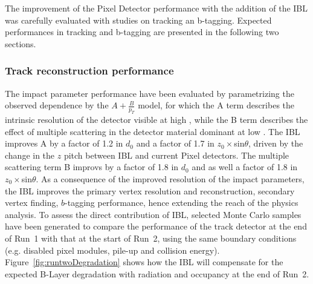 The improvement of the Pixel Detector performance with the addition of the IBL was carefully evaluated with studies on tracking an b-tagging. Expected performances in tracking and b-tagging are presented in the following two sections.

\subsubsection{Track reconstruction performance}
The impact parameter performance have been evaluated by parametrizing the observed \pt dependence by the $A+\frac{B}{p_T }$ model, for which the A term describes the intrinsic resolution of the detector visible at high \pt , while the B term describes the effect of multiple scattering in the detector material dominant at low \pt.
The IBL improves A by a factor of 1.2 in $d_0$ and a factor of 1.7 in $z_0 \times$sin$\theta$, driven by the change in the $z$ pitch between IBL and current Pixel detectors. The multiple scattering term B improvs by a factor of 1.8 in $d_0$ and as well a factor of 1.8 in $z_0 \times$sin$\theta$. As a consequence of the improved resolution of the impact parameters, the IBL improves the primary vertex resolution and reconstruction, secondary vertex finding, $b$-tagging performance, hence extending the reach of the physics analysis. To assess the direct contribution of IBL, selected Monte Carlo samples have been generated to compare the performance of the track detector at the end of Run~1 with that at the start of Run~2, using the same boundary conditions (e.g. disabled pixel modules, pile-up and collision energy).
Figure~\ref{fig:runtwoDegradation} shows how the IBL will compensate for the expected B-Layer degradation with radiation and occupancy at the end of Run~2.

